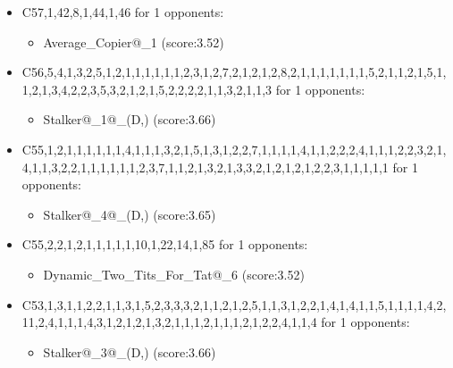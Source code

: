 \begin{appendices}
\begin{itemize}
        \item C57,1,42,8,1,44,1,46 for 1 opponents:
        \begin{multicols}{3}
            \begin{itemize}
                \item Average\_Copier@\_1 (score:3.52)
            \end{itemize}
        \end{multicols}

        \item C56,5,4,1,3,2,5,1,2,1,1,1,1,1,1,2,3,1,2,7,2,1,2,1,2,8,2,1,1,1,1,1,1,1,5,2,1,1,2,1,5,1,1,2,1,3,4,2,2,3,5,3,2,1,2,1,5,2,2,2,2,1,1,3,2,1,1,3 for 1 opponents:
        \begin{multicols}{3}
            \begin{itemize}
                \item Stalker@\_1@\_(D,) (score:3.66)
            \end{itemize}
        \end{multicols}

        \item C55,1,2,1,1,1,1,1,1,4,1,1,1,3,2,1,5,1,3,1,2,2,7,1,1,1,1,4,1,1,2,2,2,4,1,1,1,2,2,3,2,1,4,1,1,3,2,2,1,1,1,1,1,1,2,3,7,1,1,2,1,3,2,1,3,3,2,1,2,1,2,1,2,2,3,1,1,1,1,1 for 1 opponents:
        \begin{multicols}{3}
            \begin{itemize}
                \item Stalker@\_4@\_(D,) (score:3.65)
            \end{itemize}
        \end{multicols}

        \item C55,2,2,1,2,1,1,1,1,1,10,1,22,14,1,85 for 1 opponents:
        \begin{multicols}{3}
            \begin{itemize}
                \item Dynamic\_Two\_Tits\_For\_Tat@\_6 (score:3.52)
            \end{itemize}
        \end{multicols}

        \item C53,1,3,1,1,2,2,1,1,3,1,5,2,3,3,3,2,1,1,2,1,2,5,1,1,3,1,2,2,1,4,1,4,1,1,5,1,1,1,1,4,2,11,2,4,1,1,1,4,3,1,2,1,2,1,3,2,1,1,1,2,1,1,1,2,1,2,2,4,1,1,4 for 1 opponents:
        \begin{multicols}{3}
            \begin{itemize}
                \item Stalker@\_3@\_(D,) (score:3.66)
            \end{itemize}
        \end{multicols}


\end{itemize}
\end{appendices}

